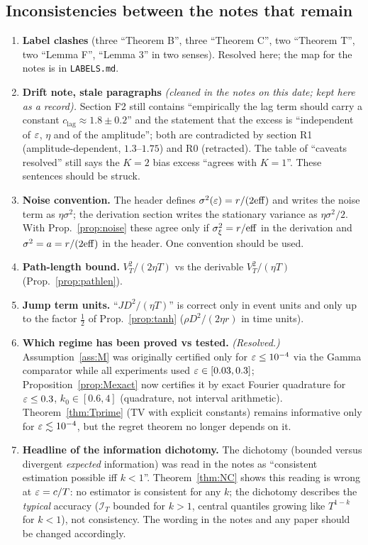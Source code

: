 \subsection{Inconsistencies between the notes that remain}

\begin{enumerate}[nosep]
\item \textbf{Label clashes} (three ``Theorem B'', three ``Theorem C'', two ``Theorem T'', two ``Lemma F'', ``Lemma 3'' in two senses). Resolved here; the map for the notes is in \texttt{LABELS.md}.
\item \textbf{Drift note, stale paragraphs} \emph{(cleaned in the notes on this date; kept here as a record).} Section F2 still contains ``empirically the lag term should carry a constant $c_{\mathrm{lag}}\approx1.8\pm0.2$'' and the statement that the excess is ``independent of $\varepsilon$, $\eta$ and of the amplitude''; both are contradicted by section R1 (amplitude-dependent, $1.3$--$1.75$) and R0 (retracted). The table of ``caveats resolved'' still says the $K=2$ bias excess ``agrees with $K=1$''. These sentences should be struck.
\item \textbf{Noise convention.} The header defines $\sigma^2(\varepsilon)=r/(2\mathrm{eff})$ and writes the noise term as $\eta\sigma^2$; the derivation section writes the stationary variance as $\eta\sigma^2/2$. With Prop.~\ref{prop:noise} these agree only if $\sigma_\xi^2=r/\mathrm{eff}$ in the derivation and $\sigma^2=a=r/(2\mathrm{eff})$ in the header. One convention should be used.
\item \textbf{Path-length bound.} $V_T^2/(2\eta T)$ vs the derivable $V_T^2/(\eta T)$ (Prop.~\ref{prop:pathlen}).
\item \textbf{Jump term units.} ``$JD^2/(\eta T)$'' is correct only in event units and only up to the factor $\frac12$ of Prop.~\ref{prop:tanh} ($\rho D^2/(2\eta r)$ in time units).
\item \textbf{Which regime has been proved vs tested.} \emph{(Resolved.)} Assumption~\ref{ass:M} was originally certified only for $\varepsilon\le10^{-4}$ via the Gamma comparator while all experiments used $\varepsilon\in[0.03,0.3]$; Proposition~\ref{prop:Mexact} now certifies it by exact Fourier quadrature for $\varepsilon\le0.3$, $k_0\in[0.6,4]$ (quadrature, not interval arithmetic). Theorem~\ref{thm:Tprime} (TV with explicit constants) remains informative only for $\varepsilon\lesssim10^{-4}$, but the regret theorem no longer depends on it.
\item \textbf{Headline of the information dichotomy.} The dichotomy (bounded versus divergent \emph{expected} information) was read in the notes as ``consistent estimation possible iff $k<1$''. Theorem~\ref{thm:NC} shows this reading is wrong at $\varepsilon=c/T$: no estimator is consistent for any $k$; the dichotomy describes the \emph{typical} accuracy ($\mathcal I_T$ bounded for $k>1$, central quantiles growing like $T^{1-k}$ for $k<1$), not consistency. The wording in the notes and any paper should be changed accordingly.

\end{enumerate}
